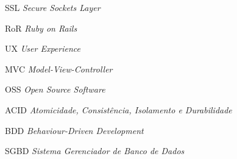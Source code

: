 \begin{siglas}
\item[SSL] \textit{Secure Sockets Layer}
\item[RoR] \textit{Ruby on Rails}
\item[UX] \textit{User Experience}
\item[MVC] \textit{Model-View-Controller}
\item[OSS] \textit{Open Source Software}
\item[ACID] \textit{Atomicidade, Consistência, Isolamento e Durabilidade}
\item[BDD] \textit{Behaviour-Driven Development}
\item[SGBD] \textit{Sistema Gerenciador de Banco de Dados}
\end{siglas}





